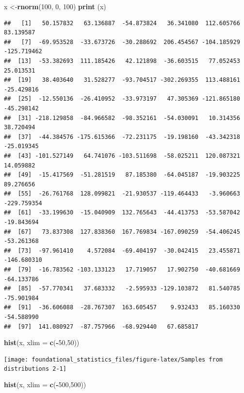 \documentclass[]{book}
\newenvironment{Shaded}{\begin{snugshade}}{\end{snugshade}}
\newcommand{\DataTypeTok}[1]{\textcolor[rgb]{0.13,0.29,0.53}{#1}}
\newcommand{\DecValTok}[1]{\textcolor[rgb]{0.00,0.00,0.81}{#1}}
\newcommand{\KeywordTok}[1]{\textcolor[rgb]{0.13,0.29,0.53}{\textbf{#1}}}
\newcommand{\NormalTok}[1]{#1}
\newcommand{\OperatorTok}[1]{\textcolor[rgb]{0.81,0.36,0.00}{\textbf{#1}}}
\begin{document}
\begin{Shaded}
\begin{Highlighting}[]
\NormalTok{x <-}\KeywordTok{rnorm}\NormalTok{(}\DecValTok{100}\NormalTok{, }\DecValTok{0}\NormalTok{, }\DecValTok{100}\NormalTok{)}
\KeywordTok{print}\NormalTok{ (x)}
\end{Highlighting}
\end{Shaded}

\begin{verbatim}
##   [1]   50.157832   63.136887  -54.873824   36.341080  112.605766   83.139587
##   [7]  -69.953528  -33.673726  -30.288692  206.454567 -104.185929 -125.719462
##  [13]  -53.382693  111.185426   42.121898  -36.603515   77.052453   25.013531
##  [19]   38.403640   31.528277  -93.704517 -302.269355  113.488161  -25.429816
##  [25]  -12.550136  -26.410952  -33.973197   47.305369 -121.865180  -45.298142
##  [31] -218.129858  -84.966582  -98.352161  -54.030091   10.314356   38.720494
##  [37]  -44.384576 -175.615366  -72.231175  -19.198160  -43.342318  -25.019345
##  [43] -101.527149   64.741076 -103.511698  -58.025211  120.087321   14.059882
##  [49]  -15.417569  -51.281519   87.185380  -64.045187  -19.903225   89.276656
##  [55]  -26.761768  128.099821  -21.930537 -119.464433   -3.960663 -229.759354
##  [61]  -33.199630  -15.040909  132.765643  -44.413753  -53.587042  -19.843694
##  [67]   73.837308  127.838360  167.769834 -167.090259  -54.406245  -53.261368
##  [73]  -97.961410    4.572084  -69.404197  -30.042415   23.455871 -146.680310
##  [79]  -16.783562 -103.133123   17.719057   17.902750  -40.681669  -64.133786
##  [85]  -57.770341   37.683332   -2.595933 -129.103872   81.540785  -75.901984
##  [91]  -36.606088  -28.767307  163.605457    9.932433   85.160330  -54.588990
##  [97]  141.080927  -87.757966  -68.929440   67.685817
\end{verbatim}

\begin{Shaded}
\begin{Highlighting}[]
\KeywordTok{hist}\NormalTok{(x, }\DataTypeTok{xlim =} \KeywordTok{c}\NormalTok{(}\OperatorTok{-}\DecValTok{50}\NormalTok{,}\DecValTok{50}\NormalTok{))}
\end{Highlighting}
\end{Shaded}

\texttt{[image: foundational\_statistics\_files/figure-latex/Samples from distributions 2-1]}

\begin{Shaded}
\begin{Highlighting}[]
\KeywordTok{hist}\NormalTok{(x, }\DataTypeTok{xlim =} \KeywordTok{c}\NormalTok{(}\OperatorTok{-}\DecValTok{500}\NormalTok{,}\DecValTok{500}\NormalTok{))}
\end{Highlighting}
\end{Shaded}
\end{document}
